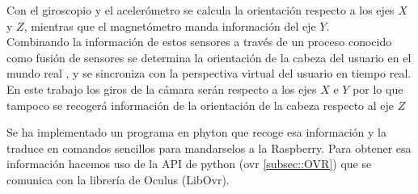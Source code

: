 \documentclass[twoside, 11pt]{epstfg}
\begin{document}
Con el giroscopio y el acelerómetro se calcula la orientación respecto a los ejes $X$ y $Z$, mientras que el magnetómetro manda información del eje $Y$.\\Combinando la información de estos sensores a través de un proceso conocido como fusión de sensores se determina la orientación de la cabeza del usuario en el mundo real , y se sincroniza con la perspectiva virtual del usuario en tiempo real.\\
En este trabajo los giros de la cámara serán respecto a los ejes $X$ e $Y$ por lo que tampoco se recogerá información de la orientación de la cabeza respecto al eje $Z$
 
Se ha implementado un programa en phyton que recoge esa información y la traduce en comandos sencillos para mandarselos a la Raspberry. Para obtener esa información hacemos uso de la API de python (ovr \ref{subsec::OVR}) que se comunica con la librería de Oculus (LibOvr).
\end{document}

